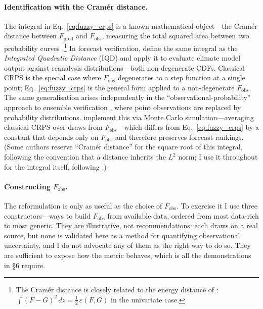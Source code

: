 \paragraph{Identification with the Cram\'er distance.}
The integral in Eq.~\ref{eq:fuzzy_crps} is a known mathematical object---the Cram\'er distance between $F_\text{pred}$ and $F_\text{obs}$, measuring the total squared area between two probability curves \citep{cramer1946}.\footnote{The Cram\'er distance is closely related to the energy distance of \citet{szekely2013energy}: $\int(F - G)^2\,dz = \tfrac{1}{2}\,\varepsilon(F,G)$ in the univariate case.} In forecast verification, \citet{thorarinsdottir2013using} define the same integral as the \emph{Integrated Quadratic Distance} (IQD) and apply it to evaluate climate model output against reanalysis distributions---both non-degenerate CDFs. Classical CRPS is the special case where $F_\text{obs}$ degenerates to a step function at a single point; Eq.~\ref{eq:fuzzy_crps} is the general form applied to a non-degenerate $F_\text{obs}$. The same generalisation arises independently in the ``observational-probability'' approach to ensemble verification \citep{candille2008impact}, where point observations are replaced by probability distributions. \citet{pinson2012verification} implement this via Monte Carlo simulation---averaging classical CRPS over draws from $F_\text{obs}$---which differs from Eq.~\ref{eq:fuzzy_crps} by a constant that depends only on $F_\text{obs}$ and therefore preserves forecast rankings. (Some authors reserve ``Cram\'er distance'' for the square root of this integral, following the convention that a distance inherits the $L^2$ norm; I use it throughout for the integral itself, following \citealt{thorarinsdottir2013using}.)

\paragraph{Constructing $F_\text{obs}$.}
The reformulation is only as useful as the choice of $F_\text{obs}$. To exercise it I use three constructors---ways to build $F_\text{obs}$ from available data, ordered from most data-rich to most generic. They are illustrative, not recommendations: each draws on a real source, but none is validated here as a method for quantifying observational uncertainty, and I do not advocate any of them as the right way to do so. They are sufficient to expose how the metric behaves, which is all the demonstrations in \S6 require.

